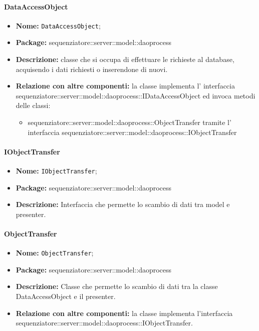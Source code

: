 \paragraph{DataAccessObject}
	\begin{itemize}
		\item \textbf{Nome:} \texttt{DataAccessObject};
		\item \textbf{Package:} sequenziatore::server::model::daoprocess
		\item \textbf{Descrizione:} classe che si occupa di effettuare le richieste al database, acquisendo i dati richiesti o inserendone di nuovi.
		\item \textbf{Relazione con altre componenti:} la classe implementa l' interfaccia sequenziatore::server::model::daoprocess::IDataAccessObject ed invoca metodi delle classi:
		\begin{itemize}
			\item sequenziatore::server::model::daoprocess::ObjectTransfer tramite l' interfaccia sequenziatore::server::model::daoprocess::IObjectTransfer
	\end{itemize}
\end{itemize}
\paragraph{IObjectTransfer}
	\begin{itemize}
		\item \textbf{Nome:} \texttt{IObjectTransfer};
		\item \textbf{Package:} sequenziatore::server::model::daoprocess
		\item \textbf{Descrizione:} Interfaccia che permette lo scambio di dati tra model e presenter.
	\end{itemize}
\paragraph{ObjectTransfer}
	\begin{itemize}
		\item \textbf{Nome:} \texttt{ObjectTransfer};
		\item \textbf{Package:} sequenziatore::server::model::daoprocess
		\item \textbf{Descrizione:} Classe che permette lo scambio di dati tra la classe DataAccessObject e il presenter.
		\item \textbf{Relazione con altre componenti:} la classe implementa l'interfaccia sequenziatore::server::model::daoprocess::IObjectTransfer.
	\end{itemize}
